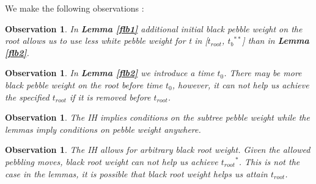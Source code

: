 \documentclass[12pt]{article}
\newtheorem{obs}[theorem]{Observation}
\newcommand{\troot}{t_{root}}
\newcommand{\troots}{{t_{root}}^*}
\newcommand{\tbss}{{t_b}^{**}}
\begin{document}
\noindent
We make the following observations : 

\begin{obs}
In {\bf Lemma \ref{flb1}} additional initial black pebble weight on the root allows us to use less white pebble weight for t in [$\troot$, $\tbss$] than in {\bf Lemma \ref{flb2}}.
\end{obs}

\begin{obs}
In {\bf Lemma \ref{flb2}} we introduce a time $t_0$. There may be more black pebble weight on the root before time $t_0$, however, it can not help us achieve the specified $\troot$ if it is removed before $\troot$.\\
\end{obs}

\begin{obs}
The IH implies conditions on the subtree pebble weight while the lemmas imply conditions on pebble weight anywhere.\\
\end{obs}

\begin{obs}
The IH allows for arbitrary black root weight. Given the allowed pebbling moves, black root weight can not help us achieve $\troots$. This is not the case in the lemmas, it is possible that black root weight helps us attain $\troot$.\\
\end{obs}
\end{document}
